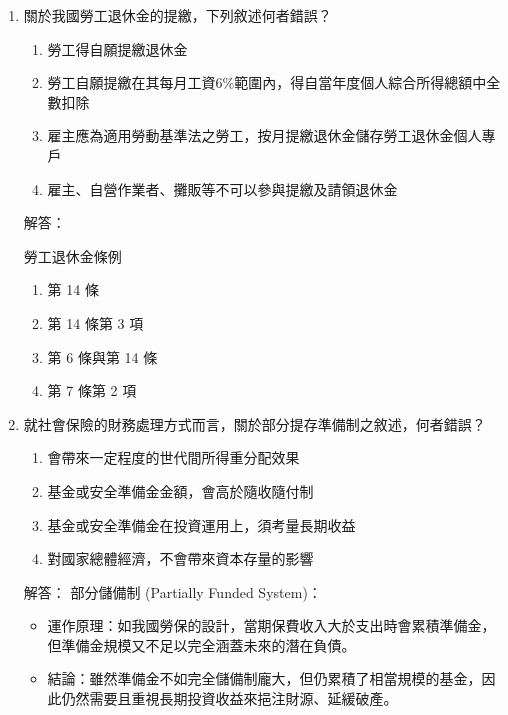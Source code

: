 \documentclass[12pt, a4paper]{article}
\begin{document}
\begin{enumerate}
    \item 關於我國勞工退休金的提繳，下列敘述何者錯誤？
    \begin{enumerate}[label=\Alph*.]
        \item 勞工得自願提繳退休金
        \item 勞工自願提繳在其每月工資6\%範圍內，得自當年度個人綜合所得總額中全數扣除
        \item 雇主應為適用勞動基準法之勞工，按月提繳退休金儲存勞工退休金個人專戶
        \item 雇主、自營作業者、攤販等不可以參與提繳及請領退休金
    \end{enumerate}
    解答：

    勞工退休金條例
    \begin{enumerate}[label=\Alph*.]
        \item 第 14 條
        \item 第 14 條第 3 項
        \item 第 6 條與第 14 條
        \item 第 7 條第 2 項
    \end{enumerate}

    \item 就社會保險的財務處理方式而言，關於部分提存準備制之敘述，何者錯誤？
    \begin{enumerate}[label=\Alph*.]
        \item 會帶來一定程度的世代間所得重分配效果
        \item 基金或安全準備金金額，會高於隨收隨付制
        \item 基金或安全準備金在投資運用上，須考量長期收益
        \item 對國家總體經濟，不會帶來資本存量的影響
    \end{enumerate}
    解答：
    部分儲備制 (Partially Funded System)：
        \begin{itemize}
            \item 運作原理：如我國勞保的設計，當期保費收入大於支出時會累積準備金，但準備金規模又不足以完全涵蓋未來的潛在負債。
            \item 結論：雖然準備金不如完全儲備制龐大，但仍累積了相當規模的基金，因此仍然需要且重視長期投資收益來挹注財源、延緩破產。
        \end{itemize}


\end{enumerate}
\end{document}
